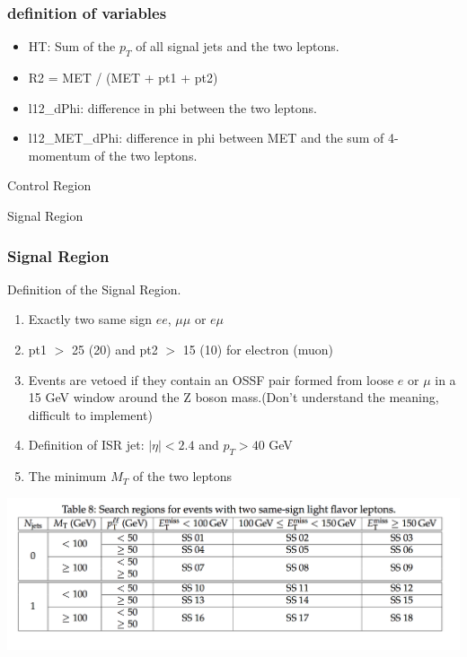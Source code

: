 \documentclass[mathserif,serif]{beamer}
\begin{document}
\begin{frame}
\frametitle{definition of variables}
\normalsize
\begin{itemize}
\item HT: Sum of the $p_T$ of all signal jets and the two leptons.
\item R2 = MET / (MET + pt1 + pt2)
\item l12\_dPhi: difference in phi between the two leptons.
\item l12\_MET\_dPhi: difference in phi between MET and the sum of 4-momentum of the two leptons.
\end{itemize}
\end{frame}

\begin{frame}
\begin{center}
\huge
Control Region
\end{center}
\end{frame}



\def \PathToPlot {../plot}


\begin{frame}
\begin{center}
\huge
Signal Region
\end{center}
\end{frame}

\begin{frame}
\frametitle{Signal Region}
Definition of the Signal Region.
\begin{enumerate}
\item Exactly two same sign $ee$, $\mu\mu$ or $e\mu$
\item pt1 $>$ 25 (20) and pt2 $>$ 15 (10) for electron (muon)
\item Events are vetoed if they contain an OSSF pair formed from loose $e$ or $\mu$ in a 15 GeV window around the Z boson mass.(Don't understand the meaning, difficult to implement)
\item Definition of ISR jet: $|\eta| < 2.4$ and $p_T > 40$ GeV
\item The minimum $M_T$ of the two leptons
\end{enumerate}
\includegraphics[width=1\textwidth]{data/photo/SR.png}
\end{frame}
\end{document}
